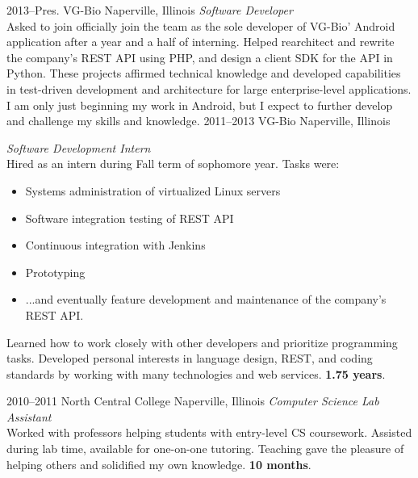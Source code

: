 \documentclass[]{friggeri-cv} %
\begin{document}
\begin{entrylist}
\entry
{2013--Pres.}
{VG-Bio}
{Naperville, Illinois}
{\emph{Software Developer} \\
    Asked to join officially join the team as the sole developer of VG-Bio' Android application after a year and a half of interning.
    Helped rearchitect and rewrite the company's REST API using PHP, and design a client SDK for the API in Python.
    These projects affirmed technical knowledge and developed capabilities in test-driven development and architecture for large enterprise-level applications.
    I am only just beginning my work in Android, but I expect to further develop and challenge my skills and knowledge.
}
\entry
{2011--2013}
{VG-Bio}
{Naperville, Illinois}
{\emph{Software Development Intern} \\
    Hired as an intern during Fall term of sophomore year.
    Tasks were:
    \begin{itemize}
        \item Systems administration of virtualized Linux servers
        \item Software integration testing of REST API
        \item Continuous integration with Jenkins
        \item Prototyping
        \item ...and eventually feature development and maintenance of the company's REST API.
    \end{itemize}
    Learned how to work closely with other developers and prioritize programming tasks.
    Developed personal interests in language design, REST, and coding standards by working with many technologies and web services. \textbf{1.75 years}.}
\entry
{2010--2011}
{North Central College}
{Naperville, Illinois}
{\emph{Computer Science Lab Assistant} \\
Worked with professors helping students with entry-level CS coursework.
Assisted during lab time, available for one-on-one tutoring.
Teaching gave the pleasure of helping others and solidified my own knowledge. \textbf{10 months}.}
\end{entrylist}
\end{document}
